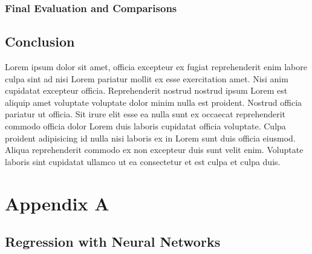 \documentclass[twoside,11pt]{report}
\begin{document}
\subsection{Final Evaluation and Comparisons}
\label{sec:comparisons}




\section{Conclusion}
\label{sec:conclusion}


Lorem ipsum dolor sit amet, officia excepteur ex fugiat reprehenderit enim labore culpa sint ad nisi Lorem pariatur mollit ex esse exercitation amet. Nisi anim cupidatat excepteur officia. Reprehenderit nostrud nostrud ipsum Lorem est aliquip amet voluptate voluptate dolor minim nulla est proident. Nostrud officia pariatur ut officia. Sit irure elit esse ea nulla sunt ex occaecat reprehenderit commodo officia dolor Lorem duis laboris cupidatat officia voluptate. Culpa proident adipisicing id nulla nisi laboris ex in Lorem sunt duis officia eiusmod. Aliqua reprehenderit commodo ex non excepteur duis sunt velit enim. Voluptate laboris sint cupidatat ullamco ut ea consectetur et est culpa et culpa duis.






















\clearpage %

\appendix
\renewcommand{\theHchapter}{appendix\Alph{chapter}}
\renewcommand{\theHsection}{appendix\thesection}

{}


\chapter*{Appendix A}
\label{app:appendixA}


\section{Regression with Neural Networks}
\label{sec:regression}
\end{document}
